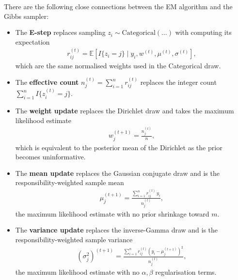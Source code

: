 \documentclass{scrartcl}
\begin{document}
There are the following close connections between the EM algorithm and
the Gibbs sampler: 
\begin{itemize}
  \item The \textbf{E-step} replaces sampling $z_i \sim \text{Categorical}(\ldots)$
  with computing its expectation
  \begin{align*}
    r_{ij}^{(t)} = \mathbb{E}\left[I\{z_i = j\} \mid y_i, w^{(t)}, \mu^{(t)},
    \sigma^{(t)}\right],
  \end{align*}
  which are the same normalised weights used in the Categorical draw.

  \item The \textbf{effective count} $n_j^{(t)} = \sum_{i=1}^n r_{ij}^{(t)}$
  replaces the integer count $\sum_{i=1}^n I\{z_i^{(t)} = j\}$.

  \item The \textbf{weight update} replaces the Dirichlet draw and takes the
  maximum likelihood estimate
  \begin{align*}
    w_j^{(t+1)} = \frac{n_j^{(t)}}{n},
  \end{align*}
  which is equivalent to the posterior mean of the Dirichlet as the prior
  becomes uninformative.

  \item The \textbf{mean update} replaces the Gaussian conjugate draw and is
  the responsibility-weighted sample mean
  \begin{align*}
    \mu_j^{(t+1)} = \frac{\sum_{i=1}^n r_{ij}^{(t)}\, y_i}{n_j^{(t)}},
  \end{align*}
  the maximum likelihood estimate with no prior shrinkage toward $m$.

  \item The \textbf{variance update} replaces the inverse-Gamma draw and is
  the responsibility-weighted sample variance
  \begin{align*}
    (\sigma_j^2)^{(t+1)} = \frac{\sum_{i=1}^n r_{ij}^{(t)}
    \left(y_i - \mu_j^{(t+1)}\right)^2}{n_j^{(t)}},
  \end{align*}
  the maximum likelihood estimate with no $\alpha, \beta$ regularisation terms.
\end{itemize}




\end{document}
